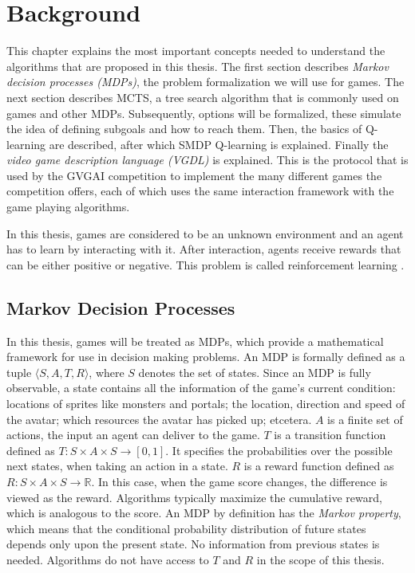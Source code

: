 \chapter{Background}
\label{sec:background}

This chapter explains the most important concepts needed to understand the
algorithms that are proposed in this thesis. The first section describes
\emph{Markov decision processes (MDPs)}, the problem formalization we will use
for games. The next section describes MCTS, a tree search algorithm that is
commonly used on games and other MDPs. Subsequently, options will be formalized,
these simulate the idea of defining subgoals and how to reach them. Then, the
basics of Q-learning are described, after which SMDP Q-learning is explained.
Finally the \emph{video game description language (VGDL)} is explained. This is
the protocol that is used by the GVGAI competition to implement the many
different games the competition offers, each of which uses the same interaction
framework with the game playing algorithms.

In this thesis, games are considered to be an unknown environment and an agent
has to learn by interacting with it. After interaction, agents receive
rewards that can be either positive or negative. This problem is called
reinforcement learning \cite{wiering2012reinforcement}.

\section{Markov Decision Processes}
\label{subsec:mdps}
In this thesis, games will be treated as MDPs, which provide a mathematical
framework for use in decision making problems. An MDP is formally defined as a
tuple $\langle S, A, T, R \rangle$, where $S$ denotes the set of states. Since an MDP
is fully observable, a state contains all the information of the
game's current condition: locations of sprites like monsters and portals; the
location, direction and speed of the avatar; which resources the avatar has
picked up; etcetera. $A$ is a finite set of actions, the input an agent can
deliver to the game. $T$ is a transition function defined as $T : S \times A
\times S \rightarrow \left[0,1\right]$. It specifies the probabilities over the
possible next states, when taking an action in a state.  $R$ is a reward
function defined as $R: S \times A \times S \rightarrow \mathbb{R}$. In this
case, when the game score changes, the difference is viewed as the reward.
Algorithms typically maximize the cumulative reward, which is analogous to the
score. An MDP by definition has the \emph{Markov property}, which means that the
conditional probability distribution of future states depends only upon the
present state. No information from previous states is needed. Algorithms do not
have access to $T$ and $R$ in the scope of this thesis.

